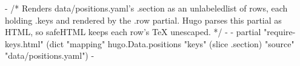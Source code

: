 {{- /* Renders data/positions.yaml's .section as an unlabeledlist of rows, each holding .keys and rendered by the .row partial.
     Hugo parses this partial as HTML, so safeHTML keeps each row's TeX unescaped. */ -}}
{{- partial "require-keys.html" (dict "mapping" hugo.Data.positions "keys" (slice .section) "source" "data/positions.yaml") -}}
